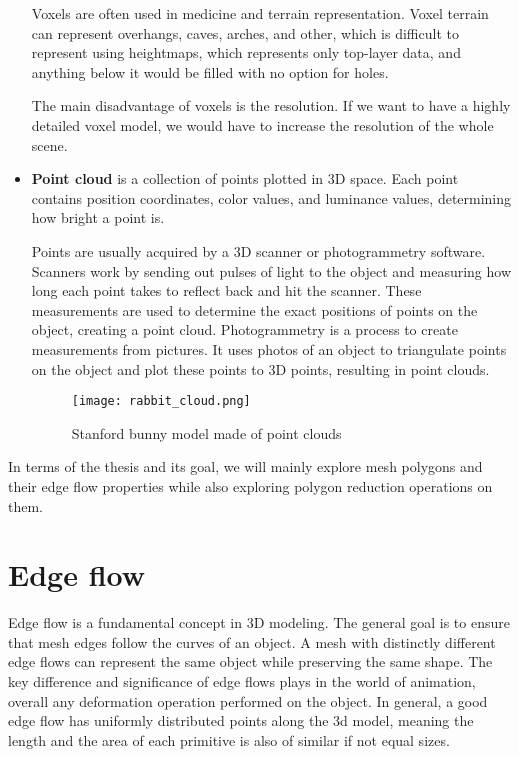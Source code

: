 \begin{itemize}
    Voxels are often used in medicine and terrain representation. Voxel terrain can represent overhangs, caves, arches, and other, which is difficult to represent using heightmaps, which represents only top-layer data, and anything below it would be filled with no option for holes.

    The main disadvantage of voxels is the resolution. If we want to have a highly detailed voxel model, we would have to increase the resolution of the whole scene.

    \item \textbf{Point cloud} is a collection of points plotted in 3D space. Each point contains position coordinates, color values, and luminance values, determining how bright a point is.
    
    Points are usually acquired by a 3D scanner or photogrammetry software. Scanners work by sending out pulses of light to the object and measuring how long each point takes to reflect back and hit the scanner. These measurements are used to determine the exact positions of points on the object, creating a point cloud. Photogrammetry is a process to create measurements from pictures. It uses photos of an object to triangulate points on the object and plot these points to 3D points, resulting in point clouds.
    
    \begin{figure}[h]
        \centering
        \texttt{[image: rabbit\_cloud.png]}
        \caption{Stanford bunny model made of point clouds \cite{stnaford}}
        \label{fig:rabbit_cloud}
    \end{figure}
  \end{itemize}

  In terms of the thesis and its goal, we will mainly explore mesh polygons and their edge flow properties while also exploring polygon reduction operations on them.

\section{Edge flow}

Edge flow is a fundamental concept in 3D modeling. The general goal is to ensure that mesh edges follow the curves of an object. A mesh with distinctly different edge flows can represent the same object while preserving the same shape. The key difference and significance of edge flows plays in the world of animation, overall any deformation operation performed on the object. In general, a good edge flow has uniformly distributed points along the 3d model, meaning the length and the area of each primitive is also of similar if not equal sizes. 

